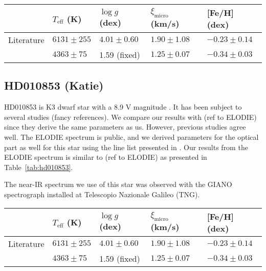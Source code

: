 \documentclass{aa}
\begin{document}
\begin{table*}[htb!]
    \caption{The derived parameters for Arcturus with
    fixed surface gravity cut after 3$\sigma$ outlier removal. linelist: arcturus2Cut4ol.moog}
    \label{tab:arcturus}
    \centering
    \begin{tabular}{lllll}
      \hline\hline
                     & $T_\mathrm{eff}$ (K) &  $\log g$ (dex)  &   $\xi_\mathrm{micro}$ (km/s)  & [Fe/H] (dex)      \\
      \hline
        Literature   & $6131 \pm 255$       &  $4.01 \pm 0.60$ &    $1.90 \pm 1.08$              & $-0.23 \pm 0.14$ \\
      \hline
                     & $4363 \pm 75$        &   1.59 (fixed)   &    $1.25 \pm 0.07$              & $-0.34 \pm 0.03$ \\
      \hline
    \end{tabular}
\end{table*}



\subsection{HD010853 (Katie)}
\label{sub:HD010853}
HD010853 is K3 dwarf star with a 8.9 V magnitude \citep{Koen2010}. It has
been subject to several studies (fancy references). We compare our results
with (ref to ELODIE) since they derive the same parameters as us. However,
previous studies agree well. The ELODIE spectrum is public, and we derived
parameters for the optical part as well for this star using the line list
presented in \citet{Sousa2008a}. Our results from the ELODIE spectrum is
similar to (ref to ELODIE) as presented in Table~\ref{tab:hd010853}.

The near-IR spectrum we use of this star was observed with the GIANO
spectrograph installed at Telescopio Nazionale Galileo (TNG).




\begin{table*}[htb!]
    \caption{The derived parameters for HD010853 with
    fixed surface gravity cut after 3$\sigma$ outlier removal. linelist: arcturus2Cut4ol.moog}
    \label{tab:hd010853}
    \centering
    \begin{tabular}{lllll}
      \hline\hline
                     & $T_\mathrm{eff}$ (K) &  $\log g$ (dex)  &   $\xi_\mathrm{micro}$ (km/s)  & [Fe/H] (dex)      \\
      \hline
        Literature   & $6131 \pm 255$       &  $4.01 \pm 0.60$ &    $1.90 \pm 1.08$              & $-0.23 \pm 0.14$ \\
      \hline
                     & $4363 \pm 75$        &   1.59 (fixed)   &    $1.25 \pm 0.07$              & $-0.34 \pm 0.03$ \\
      \hline
    \end{tabular}
\end{table*}
\end{document}
